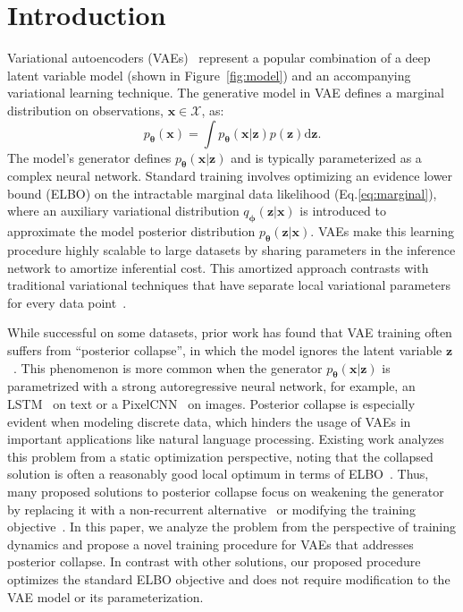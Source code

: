 \documentclass{article} \usepackage{iclr2019_conference,times}
\def\rvx{{\mathbf{x}}}
\def\rvz{{\mathbf{z}}}
\def\vtheta{{\bm{\theta}}}
\def\vphi{{\bm{\phi}}}
\def\gX{{\mathcal{X}}}
\newcommand{\qzx}{q_{\vphi}(\rvz|\rvx)}
\newcommand{\pzx}{p_{\vtheta}(\rvz|\rvx)}
\newcommand{\pxz}{p_{\vtheta}(\rvx|\rvz)}
\begin{document}
\section{Introduction}
Variational autoencoders (VAEs)~\citep{kingma2013auto} represent a popular combination of a deep latent variable model 
(shown in Figure~\ref{fig:model}) and an accompanying variational learning technique. The generative model in VAE defines a marginal distribution on observations, $\rvx\in \gX$, as:
\begin{equation}
\label{eq:marginal}
p_{\vtheta}(\rvx) = \int p_{\vtheta}(\rvx|\rvz)p(\rvz)\text{d}\rvz.
\end{equation}
The model's generator defines $p_{\vtheta}(\rvx|\rvz)$ and is typically parameterized as a complex neural network. Standard training involves optimizing an evidence lower bound (ELBO) on the intractable marginal data likelihood (Eq.\ref{eq:marginal}), where an auxiliary variational distribution $\qzx$ is introduced to approximate the model posterior distribution $\pzx$. VAEs make this learning procedure highly scalable to large datasets by sharing parameters in the inference network to amortize inferential cost. This amortized approach contrasts with traditional variational techniques that have separate local variational parameters for every data point~\citep{blei2003latent,hoffman2013stochastic}.

While successful on some datasets, prior work has found that VAE training often suffers from ``posterior collapse'', in which the model ignores the latent variable $\rvz$~\citep{bowman2015generating,kingma2016improved, chen2016variational}. This phenomenon is more common when the generator $\pxz$ is parametrized with a strong autoregressive neural network, for example, an LSTM~\citep{hochreiter1997long} on text or a PixelCNN~\citep{van2016conditional} on images.
Posterior collapse is especially evident when modeling discrete data, which hinders the usage of VAEs in important applications like natural language processing.
Existing work analyzes this problem from a static optimization perspective, noting that the collapsed solution is often a reasonably good local optimum in terms of ELBO~\citep{chen2016variational,zhao2017infovae,alemi2018fixing}.
Thus, many proposed solutions to posterior collapse focus on weakening the generator by replacing it with a non-recurrent alternative~\citep{yang2017improved,semeniuta2017hybrid} or modifying the training objective~\citep{zhao2017infovae,tolstikhin2017wasserstein}. In this paper, we analyze the problem from the perspective of training dynamics and propose a novel training procedure for VAEs that addresses posterior collapse. In contrast with other solutions, our proposed procedure optimizes the standard ELBO objective and does not require modification to the VAE model or its parameterization.
\end{document}
